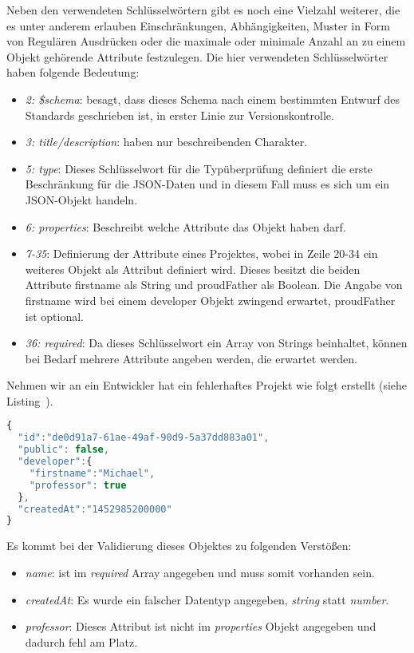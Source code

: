 Neben den verwendeten Schlüsselwörtern gibt es noch eine Vielzahl weiterer, die es unter anderem erlauben Einschränkungen, Abhängigkeiten,
Muster in Form von Regulären Ausdrücken oder die maximale oder minimale Anzahl an zu einem Objekt gehörende Attribute festzulegen.
Die hier verwendeten Schlüsselwörter haben folgende Bedeutung:

\begin{itemize}
    \label{basics:jsonschema:items}
    \setlength\itemsep{-1em}
    \item \emph{2: \$schema}: besagt, dass dieses Schema nach einem bestimmten Entwurf des Standards geschrieben ist, in erster Linie zur Versionskontrolle.
    \item \emph{3: title/description}: haben nur beschreibenden Charakter.
    \item \emph{5: type}: Dieses Schlüsselwort für die Typüberprüfung definiert die erste Beschränkung für die JSON-Daten und in diesem Fall muss es sich um ein JSON-Objekt handeln.
    \item \emph{6: properties}: Beschreibt welche Attribute das Objekt haben darf.
    \item \emph{7-35}: Definierung der Attribute eines Projektes, wobei in Zeile 20-34 ein weiteres Objekt als Attribut definiert wird. Dieses besitzt die beiden Attribute firstname als String und proudFather als Boolean. Die Angabe von firstname wird bei einem developer Objekt zwingend erwartet, proudFather ist optional.
    \item \emph{36: required}: Da dieses Schlüsselwort ein Array von Strings beinhaltet, können bei Bedarf mehrere Attribute angeben werden, die erwartet werden.
\end{itemize}

Nehmen wir an ein Entwickler hat ein fehlerhaftes Projekt wie folgt erstellt (siehe Listing~).

\begin{lstlisting}[language=Javascript,float=h!,caption={Ein fehlerhaftes Projekt}, label={fig:basics:jsonschema:2}]
{
  "id":"de0d91a7-61ae-49af-90d9-5a37dd883a01",
  "public": false,
  "developer":{
    "firstname":"Michael",
    "professor": true
  },
  "createdAt":"1452985200000"
}
\end{lstlisting}

Es kommt bei der Validierung dieses Objektes zu folgenden Verstößen:

\begin{itemize}
    \setlength\itemsep{-1em}
    \item \emph{name}: ist im \emph{required} Array angegeben und muss somit vorhanden sein.
    \item \emph{createdAt}: Es wurde ein falscher Datentyp angegeben, \emph{string} statt \emph{number}.
    \item \emph{professor}: Dieses Attribut ist nicht im \emph{properties} Objekt angegeben und dadurch fehl am Platz.
\end{itemize}

